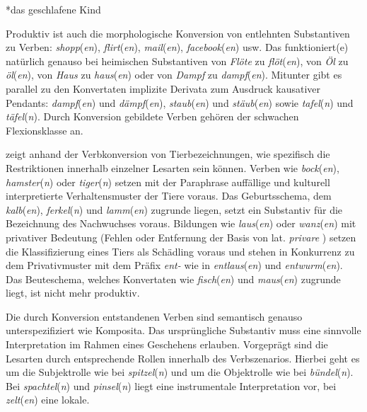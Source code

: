 \ea \label{ea:*geschlafene} *das geschlafene Kind
\z 

Produktiv ist auch die morphologische Konversion von entlehnten Substantiven zu Verben: \textit{shopp}(\textit{en}), \textit{flirt}(\textit{en}), \textit{mail}(\textit{en}), \textit{facebook}(\textit{en}) usw. Das funktioniert(e) natürlich genauso bei heimischen Substantiven von \textit{Flöte} zu \textit{flöt}(\textit{en}), von \textit{Öl} zu \textit{öl}(\textit{en}), von \textit{Haus} zu \textit{haus}(\textit{en}) oder von \textit{Dampf} zu \textit{dampf}(\textit{en}). Mitunter gibt es parallel zu den Konvertaten implizite Derivata zum Ausdruck kausativer Pendants: \textit{dampf}(\textit{en}) und \textit{dämpf}(\textit{en}), \textit{staub}(\textit{en}) und \textit{stäub}(\textit{en}) sowie \textit{tafel}(\textit{n}) und \textit{täfel}(\textit{n}). Durch Konversion gebildete Verben gehören der schwachen Flexionsklasse an.

\citet[107--114]{Plank1981} zeigt anhand der Verbkonversion von Tierbezeichnungen, wie spezifisch die Restriktionen innerhalb einzelner Lesarten sein können. Verben wie \textit{bock}(\textit{en}), \textit{hamster}(\textit{n}) oder \textit{tiger}(\textit{n}) setzen mit der Paraphrase  auffällige und kulturell interpretierte Verhaltensmuster der Tiere voraus. Das Geburtsschema, dem \textit{kalb}(\textit{en}), \textit{ferkel}(\textit{n}) und \textit{lamm}(\textit{en}) zugrunde liegen, setzt ein Substantiv für die Bezeichnung des Nachwuchses voraus. Bildungen wie \textit{laus}(\textit{en}) oder \textit{wanz}(\textit{en}) mit privativer Bedeutung (Fehlen oder Entfernung der Basis von lat. \textit{privare} ) setzen die Klassifizierung eines Tiers als Schädling voraus und stehen in Konkurrenz zu dem Privativmuster mit dem Präfix \textit{ent-} wie in \textit{entlaus}(\textit{en}) und \textit{entwurm}(\textit{en}). Das Beuteschema, welches Konvertaten wie \textit{fisch}(\textit{en}) und \textit{maus}(\textit{en}) zugrunde liegt, ist nicht mehr produktiv.

Die durch Konversion entstandenen Verben sind semantisch genauso unterspezifiziert wie Komposita. Das ursprüngliche Substantiv muss eine sinnvolle Interpretation im Rahmen eines Geschehens erlauben. Vorgeprägt sind die Lesarten durch entsprechende Rollen innerhalb des Verbszenarios. Hierbei geht es um die Subjektrolle wie bei \textit{spitzel}(\textit{n}) und um die Objektrolle wie bei \textit{bündel}(\textit{n}). Bei \textit{spachtel}(\textit{n}) und \textit{pinsel}(\textit{n}) liegt eine instrumentale Interpretation vor, bei \textit{zelt}(\textit{en}) eine lokale.


